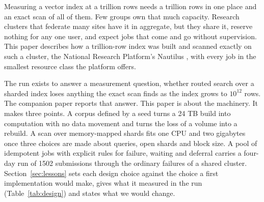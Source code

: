 \documentclass[sigconf, nonacm]{acmart}
\begin{document}
Measuring a vector index at a trillion rows needs a trillion rows in one place and an exact scan of
all of them. Few groups own that much capacity. Research clusters that federate many sites have it
in aggregate, but they share it, reserve nothing for any one user, and expect jobs that come and go
without supervision. This paper describes how a trillion-row index was built and scanned exactly on
such a cluster, the National Research Platform's Nautilus \cite{weitzel2025nrp}, with every job in
the smallest resource class the platform offers.

The run exists to answer a measurement question, whether routed search over a sharded index loses
anything the exact scan finds as the index grows to $10^{12}$ rows. The companion paper
\cite{bond2026recall} reports that answer. This paper is about the machinery. It makes three
points. A corpus defined by a seed turns a 24 TB build into computation with no data movement and
turns the loss of a volume into a rebuild. A scan over memory-mapped shards fits one CPU and two
gigabytes once three choices are made about queries, open shards and block size. A pool of
idempotent jobs with explicit rules for failure, waiting and deferral carries a four-day run of
1502 submissions through the ordinary failures of a shared cluster. Section~\ref{sec:lessons}
sets each design choice against the choice a first implementation would make, gives what it
measured in the run (Table~\ref{tab:design}) and states what we would change.
\end{document}
